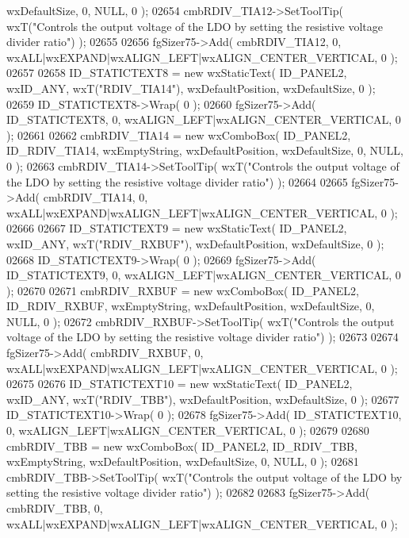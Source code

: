 \begin{DoxyCode}
      wxDefaultSize, 0, NULL, 0 ); 
02654     cmbRDIV_TIA12->SetToolTip( wxT(\textcolor{stringliteral}{"Controls the output voltage of the LDO by setting the resistive voltage
       divider ratio"}) );
02655     
02656     fgSizer75->Add( cmbRDIV_TIA12, 0, wxALL|wxEXPAND|wxALIGN\_LEFT|wxALIGN\_CENTER\_VERTICAL, 0 );
02657     
02658     ID_STATICTEXT8 = \textcolor{keyword}{new} wxStaticText( ID_PANEL2, wxID\_ANY, wxT(\textcolor{stringliteral}{"RDIV\_TIA14"}), wxDefaultPosition, 
      wxDefaultSize, 0 );
02659     ID_STATICTEXT8->Wrap( 0 );
02660     fgSizer75->Add( ID_STATICTEXT8, 0, wxALIGN\_LEFT|wxALIGN\_CENTER\_VERTICAL, 0 );
02661     
02662     cmbRDIV_TIA14 = \textcolor{keyword}{new} wxComboBox( ID_PANEL2, ID_RDIV_TIA14, wxEmptyString, wxDefaultPosition, 
      wxDefaultSize, 0, NULL, 0 ); 
02663     cmbRDIV_TIA14->SetToolTip( wxT(\textcolor{stringliteral}{"Controls the output voltage of the LDO by setting the resistive voltage
       divider ratio"}) );
02664     
02665     fgSizer75->Add( cmbRDIV_TIA14, 0, wxALL|wxEXPAND|wxALIGN\_LEFT|wxALIGN\_CENTER\_VERTICAL, 0 );
02666     
02667     ID_STATICTEXT9 = \textcolor{keyword}{new} wxStaticText( ID_PANEL2, wxID\_ANY, wxT(\textcolor{stringliteral}{"RDIV\_RXBUF"}), wxDefaultPosition, 
      wxDefaultSize, 0 );
02668     ID_STATICTEXT9->Wrap( 0 );
02669     fgSizer75->Add( ID_STATICTEXT9, 0, wxALIGN\_LEFT|wxALIGN\_CENTER\_VERTICAL, 0 );
02670     
02671     cmbRDIV_RXBUF = \textcolor{keyword}{new} wxComboBox( ID_PANEL2, ID_RDIV_RXBUF, wxEmptyString, wxDefaultPosition, 
      wxDefaultSize, 0, NULL, 0 ); 
02672     cmbRDIV_RXBUF->SetToolTip( wxT(\textcolor{stringliteral}{"Controls the output voltage of the LDO by setting the resistive voltage
       divider ratio"}) );
02673     
02674     fgSizer75->Add( cmbRDIV_RXBUF, 0, wxALL|wxEXPAND|wxALIGN\_LEFT|wxALIGN\_CENTER\_VERTICAL, 0 );
02675     
02676     ID_STATICTEXT10 = \textcolor{keyword}{new} wxStaticText( ID_PANEL2, wxID\_ANY, wxT(\textcolor{stringliteral}{"RDIV\_TBB"}), wxDefaultPosition, 
      wxDefaultSize, 0 );
02677     ID_STATICTEXT10->Wrap( 0 );
02678     fgSizer75->Add( ID_STATICTEXT10, 0, wxALIGN\_LEFT|wxALIGN\_CENTER\_VERTICAL, 0 );
02679     
02680     cmbRDIV_TBB = \textcolor{keyword}{new} wxComboBox( ID_PANEL2, ID_RDIV_TBB, wxEmptyString, wxDefaultPosition, wxDefaultSize, 
      0, NULL, 0 ); 
02681     cmbRDIV_TBB->SetToolTip( wxT(\textcolor{stringliteral}{"Controls the output voltage of the LDO by setting the resistive voltage
       divider ratio"}) );
02682     
02683     fgSizer75->Add( cmbRDIV_TBB, 0, wxALL|wxEXPAND|wxALIGN\_LEFT|wxALIGN\_CENTER\_VERTICAL, 0 );

\end{DoxyCode}
